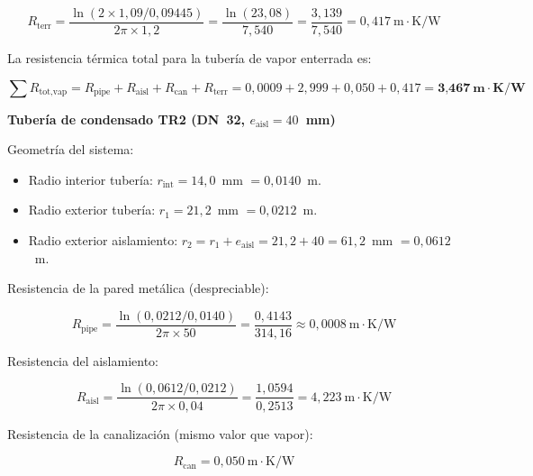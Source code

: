 \documentclass[12pt]{article}
\begin{document}
\begin{equation}
	R_{\text{terr}} = \frac{\ln(2 \times 1{,}09 / 0{,}09445)}{2\pi \times 1{,}2} = \frac{\ln(23{,}08)}{7{,}540} = \frac{3{,}139}{7{,}540} = 0{,}417~\text{m}\cdot\text{K/W}
	\label{eq:resist_terr_TR2_vap}
\end{equation}

La resistencia térmica total para la tubería de vapor enterrada es:

\begin{equation}
	\sum R_{\text{tot,vap}} = R_{\text{pipe}} + R_{\text{aisl}} + R_{\text{can}} + R_{\text{terr}} = 0{,}0009 + 2{,}999 + 0{,}050 + 0{,}417 = \textbf{3{,}467}~\textbf{m}\cdot\textbf{K/W}
	\label{eq:resist_total_TR2_vap}
\end{equation}

\textbf{Tubería de condensado TR2 (DN~32, $e_{\text{aisl}} = 40$~mm)}

Geometría del sistema:

\begin{itemize}[noitemsep]
	\item Radio interior tubería: $r_{\text{int}} = 14{,}0$~mm $= 0{,}0140$~m.
	\item Radio exterior tubería: $r_1 = 21{,}2$~mm $= 0{,}0212$~m.
	\item Radio exterior aislamiento: $r_2 = r_1 + e_{\text{aisl}} = 21{,}2 + 40 = 61{,}2$~mm $= 0{,}0612$~m.
\end{itemize}

Resistencia de la pared metálica (despreciable):

\begin{equation}
	R_{\text{pipe}} = \frac{\ln(0{,}0212 / 0{,}0140)}{2\pi \times 50} = \frac{0{,}4143}{314{,}16} \approx 0{,}0008~\text{m}\cdot\text{K/W}
	\label{eq:resist_pipe_TR2_cond}
\end{equation}

Resistencia del aislamiento:

\begin{equation}
	R_{\text{aisl}} = \frac{\ln(0{,}0612 / 0{,}0212)}{2\pi \times 0{,}04} = \frac{1{,}0594}{0{,}2513} = 4{,}223~\text{m}\cdot\text{K/W}
	\label{eq:resist_aisl_TR2_cond}
\end{equation}

Resistencia de la canalización (mismo valor que vapor):

\begin{equation}
	R_{\text{can}} = 0{,}050~\text{m}\cdot\text{K/W}
	\label{eq:resist_can_TR2_cond}
\end{equation}
\end{document}
